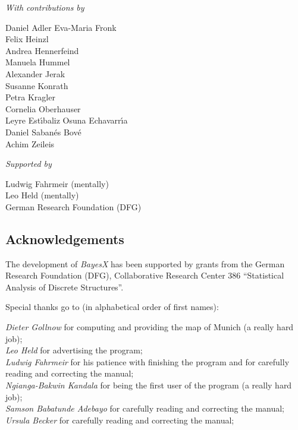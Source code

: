 {\vspace{2ex}

{\em With contributions by}

\vspace{-1.5ex}

\begin{multicols}{2}
Daniel Adler
Eva-Maria Fronk\\
Felix Heinzl\\
Andrea Hennerfeind\\
Manuela Hummel\\
Alexander Jerak\\
Susanne Konrath\\
Petra Kragler\\
Cornelia Oberhauser\\
Leyre Est\'{\i}baliz Osuna Echavarr\'{\i}a\\
Daniel Saban\'{e}s Bov\'{e} \\
Achim Zeileis
\end{multicols}

{\em Supported by}

Ludwig Fahrmeir (mentally)\\
Leo Held (mentally)\\
German Research Foundation (DFG)

\newpage

\subsection*{Acknowledgements}

The development of {\em BayesX} has been supported by grants from the German Research Foundation (DFG), Collaborative
Research Center 386 ``Statistical Analysis of Discrete Structures''.

Special thanks go to (in alphabetical order of first names):

{\em Dieter Gollnow} for computing and providing the map of Munich (a really hard job); \\
{\em Leo Held} for advertising the program; \\
{\em Ludwig Fahrmeir} for his patience with finishing the program and for carefully
reading and correcting the  manual; \\
{\em Ngianga-Bakwin Kandala} for being the first user of the program (a really hard job); \\
{\em Samson Babatunde Adebayo} for carefully reading and correcting the manual; \\
{\em Ursula Becker} for carefully reading and correcting the manual;

}

